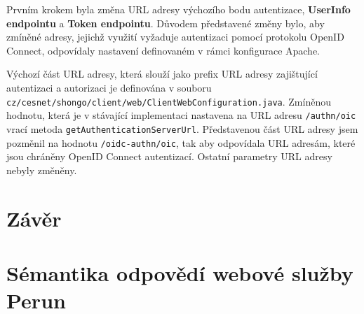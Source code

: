 \documentclass[
  printed, %
  twoside, %
  table,   %
  nolof,     %
  nolot,     %
]{fithesis3}
\begin{document}
Prvním krokem byla změna URL adresy výchozího bodu autentizace, \textbf{UserInfo endpointu} a \textbf{Token endpointu}. Důvodem představené změny bylo, aby zmíněné adresy, jejichž využití vyžaduje autentizaci pomocí protokolu OpenID Connect, odpovídaly nastavení definovaném v rámci konfigurace Apache. \par


Výchozí část URL adresy, která slouží jako prefix URL adresy zajištující autentizaci a autorizaci je definována v souboru \texttt{cz/cesnet/shongo/client/web/ClientWebConfiguration.java}. Zmíněnou hodnotu, která je v stávající implementaci nastavena na URL adresu \texttt{/authn/oic} vrací metoda \texttt{getAuthenticationServerUrl}. Představenou část URL adresy jsem pozměnil na hodnotu \texttt{/oidc-authn/oic}, tak aby odpovídala URL adresám, které jsou chráněny OpenID Connect autentizací. Ostatní parametry URL adresy nebyly změněny. \par


\chapter{Závěr}
\printbibliography[title={Literatura}]

\appendix %
\chapter{Sémantika odpovědí webové služby Perun}
\end{document}

